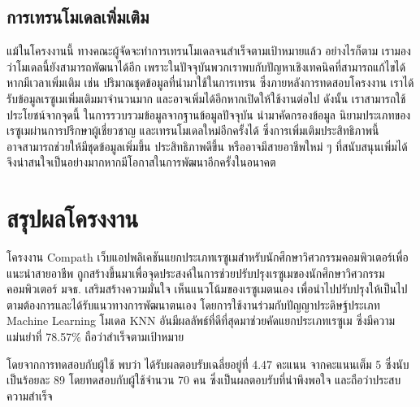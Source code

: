 \subsection{การเทรนโมเดลเพิ่มเติม}
\par{
    แม้ในโครงงานนี้ ทางคณะผู้จัดจะทำการเทรนโมเดลจนสำเร็จตามเป้าหมายแล้ว อย่างไรก็ตาม เรามองว่าโมเดลนี้ยังสามารถพัฒนาได้อีก เพราะในปัจจุบันพวกเราพบกับปัญหาเชิงเทคนิคที่สามารถแก้ไขได้หากมีเวลาเพิ่มเติม
    เช่น ปริมาณชุดข้อมูลที่นำมาใช้ในการเทรน ซึ่งภายหลังการทดสอบโครงงาน เราได้รับข้อมูลเรซูเมเพิ่มเติมมาจำนวนมาก และอาจเพิ่มได้อีกหากเปิดให้ใช้งานต่อไป
    ดังนั้น เราสามารถใช้ประโยชน์จากจุดนี้ ในการรวบรวมข้อมูลจากฐานข้อมูลปัจจุบัน นำมาคัดกรองข้อมูล นิยามประเภทของเรซูเมผ่านการปรึกษาผู้เชี่ยวชาญ 
    และเทรนโมเดลใหม่อีกครั้งได้ ซึ่งการเพิ่มเติมประสิทธิภาพนี้ อาจสามารถช่วยให้มีชุดข้อมูลเพิ่มขึ้น ประสิทธิภาพดีขึ้น หรืออาจมีสายอาชีพใหม่ ๆ ที่สนับสนุนเพิ่มได้
    จึงน่าสนใจเป็นอย่างมากหากมีโอกาสในการพัฒนาอีกครั้งในอนาคต
}

\section{สรุปผลโครงงาน}
\par{
    โครงงาน Compath เว็บแอปพลิเคชันแยกประเภทเรซูเมสำหรับนักศึกษาวิศวกรรมคอมพิวเตอร์เพื่อแนะนำสายอาชีพ
    ถูกสร้างขึ้นมาเพื่อจุดประสงค์ในการช่วยปรับปรุงเรซูเมของนักศึกษาวิศวกรรมคอมพิวเตอร์ มจธ. เสริมสร้างความมั่นใจ เห็นแนวโน้มของเรซูเมตนเอง เพื่อนำไปปรับปรุงให้เป็นไปตามต้องการและได้รับแนวทางการพัฒนาตนเอง
    โดยการใช้งานร่วมกับปัญญาประดิษฐ์ประเภท Machine Learning โมเดล KNN อันมีผลลัพธ์ที่ดีที่สุดมาช่วยคัดแยกประเภทเรซูเม ซึ่งมีความแม่นยำที่ 78.57\% ถือว่าสำเร็จตามเป้าหมาย
    
    โดยจากการทดสอบกับผู้ใช้ พบว่า ได้รับผลตอบรับเฉลี่ยอยู่ที่ 4.47 คะแนน จากคะแนนเต็ม 5 ซึ่งนับเป็นร้อยละ 89 โดยทดสอบกับผู้ใช้จำนวน 70 คน ซึ่งเป็นผลตอบรับที่น่าพึงพอใจ และถือว่าประสบความสำเร็จ
}
